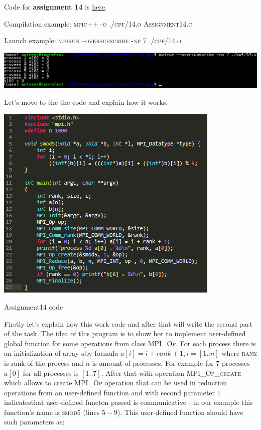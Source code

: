 \documentclass[%
12pt, %
final, %
oneside, %
onecolumn, %
centertags]{article} %
\theoremstyle{plain}
\theoremstyle{definition}
\theoremstyle{remark}
\begin{document}
Code for \textbf{assignment 14} is \href{https:\//github.com/aptmess/parallel_algorithms/blob/master/HT/hw_mpi/Assignment14.c}{here}.

Compilation example: \textsc{mpic++ -o ./cpf/14.o Assignment14.c}

Launch example: \textsc{mpirun --oversubscribe -np 7 ./cpf/14.o}

\begin{center}
\includegraphics[scale=0.55]{14.png}
\end{center}

Let's move to the the code and explain how it works.

\begin{center}
\includegraphics[scale=1.02]{14.code.png}

Assignment14 code
\end{center}

Firstly let's explain how this work code and after that will write the second part of the task. The idea of this program is to show hot to implement user-defined global function for some operations from class \textsc{MPI\_Op}. For each process there is an initialization of array $a$by formula $a[i] = i + rank + 1, i = [1..n]$  where \textsc{rank} is rank of the process and $n$ is amount of processes. For example for $7$ processes $a[0]$ for all processes is $[1..7]$. After that with operation \textsc{MPI\_Op\_create} which allows to create \textsc{MPI\_Op} operation that can be used in reduction operations from an user-defined function and with second parameter $1$ indicatesthat user-defined functon passed is communicative - in our example this function's name is \textsc{smod5} (lines $5-9$). This user-defined function should have such parameters as:
\end{document}
